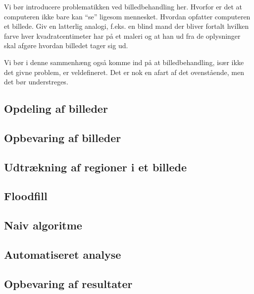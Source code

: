 {
{\sffamily Vi bør introducere problematikken ved billedbehandling her.
Hvorfor er det at computeren ikke bare kan ``se'' ligesom mennesket.
Hvordan opfatter computeren et billede. Giv en latterlig analogi, f.eks.
en blind mand der bliver fortalt hvilken farve hver kvadratcentimeter
har på et maleri og at han ud fra de oplysninger skal afgøre hvordan
billedet tager sig ud.

Vi bør i denne sammenhæng også komme ind på at billedbehandling, især
ikke det givne problem, er veldefineret. Det er nok en afart af det
ovenstående, men det bør understreges.
}

\subsection{Opdeling af billeder}


\subsection{Opbevaring af billeder\label{section_opbv_billeder}}


\subsection{Udtrækning af regioner i et billede}


\subsection{Floodfill}


\subsection{Naiv algoritme\label{naiv_algoritme}}


\subsection{Automatiseret analyse}


\subsection{Opbevaring af resultater\label{section_results}}


}

